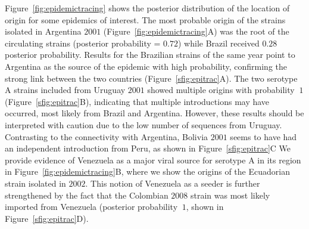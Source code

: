 \documentclass[10pt]{article}
\begin{document}
Figure~\ref{fig:epidemictracing} shows the posterior distribution of the location of origin for some epidemics of interest.
The most probable origin of the strains isolated in Argentina $2001$ (Figure~\ref{fig:epidemictracing}A) was the root of the circulating strains (posterior probability = $0.72$) while Brazil received $0.28$ posterior probability.
Results for the Brazilian strains of the same year point to Argentina as the source of the epidemic with high probability, confirming the strong link between the two countries (Figure~\ref{sfig:epitrac}A).
The two serotype A strains included from Uruguay $2001$ showed multiple origins with probability $~1$ (Figure~\ref{sfig:epitrac}B), indicating that multiple introductions may have occurred, most likely from Brazil and Argentina.
However, these results should be interpreted with caution due to the low number of sequences from Uruguay.
Contrasting to the connectivity with Argentina, Bolivia $2001$ seems to have had an independent introduction from Peru, as shown in Figure~\ref{sfig:epitrac}C
We provide evidence of Venezuela as a major viral source for serotype A in its region in Figure~\ref{fig:epidemictracing}B, where we show the origins of the Ecuadorian strain isolated in $2002$.
This notion of Venezuela as a seeder is further strengthened by the fact that the Colombian $2008$ strain was most likely imported from Venezuela (posterior probability $~1$, shown in Figure~\ref{sfig:epitrac}D).
\end{document}
